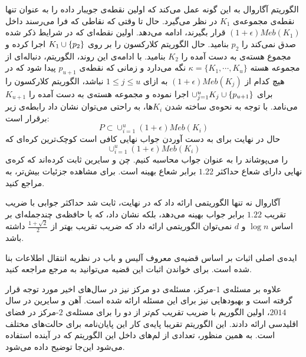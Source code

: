 الگوریتم آگاروال به این گونه عمل می‌کند که اولین نقطه‌ی جویبار داده را به عنوان تنها نقطه‌ی مجموعه‌ی $K_1$ در نظر می‌گیرد. حال تا وقتی که نقاطی که فرا می‌رسند داخل $(1 + \epsilon)Meb(K_1)$ قرار بگیرند، ادامه می‌دهد. اولین نقطه‌ای که در شرایط‌ ذکر شده صدق نمی‌کند را $p_2$ بنامید. حال الگوریتم کلارکسون را بر روی $K_1 \cup \left\{ p_2 \right\}$ اجرا کرده و مجموع هسته‌ی به دست آمده را $K_2$ بنامید. با ادامه‌ی این روند، الگوریتم، دنباله‌ای از مجموعه هسته $\kappa = \{ K_1, \cdots, K_u \}$ نگه می‌دارد و زمانی که نقطه‌ی $p_{u+1}$ پیدا شود که در هیچ کدام از $(1 + \epsilon)Meb(K_j)$ به ازای $1 \leq j \leq u$ نباشد، الگوریتم کلارکسون را برای $\cup_{j = 1}^{u} K_j \cup \left\{ p_{u+1} \right\}$ اجرا نموده و مجموعه هسته‌ی به دست آمده را $K_{u+1}$ می‌نامد. با توجه به نحوه‌ی ساخته شدن $K_i$ها، به راحتی می‌توان نشان داد رابطه‌ی زیر برقرار است:
$$P \subset \cup_{i=1}^u (1+\epsilon)Meb(K_i)$$
حال در نهایت برای به دست آوردن جواب نهایی کافی است کوچک‌ترین کره‌ای که 
$$\cup_{i=1}^u (1+\epsilon)Meb(K_i)$$
 را می‌پوشاند را به عنوان جواب محاسبه کنیم. چن و سایرین ثابت کرده‌اند که کره‌ی نهایی دارای شعاع حداکثر $1.22$ برابر شعاع بهینه است. برای مشاهده‌ جزئیات بیش‌تر، به  مراجع کنید.

آگاروال نه تنها الگوریتمی ارائه داد که در نهایت، ثابت شد حداکثر جوابی با ضریب تقریب $1.22$ برابر جواب بهینه می‌دهد، بلکه نشان داد، که با حافظه‌ی چندجمله‌ای بر اساس $\log{n}$ و $d$ نمی‌توان الگوریتمی ارائه داد که ضریب تقریب بهتر از $\frac{1 + \sqrt{2}}{2}$ داشته باشد.




ایده‌ی اصلی اثبات بر اساس قضیه‌ی معروف آلیس و باب در نظریه انتقال اطلاعات بنا شده است. برای خواندن اثبات این قضیه می‌توانید به مرجع  مراجعه کنید.


علاوه بر مسئله‌ی $1$-مرکز، مسئله‌ی دو مرکز نیز در سال‌های اخیر مورد توجه قرار گرفته است و بهبود‌هایی نیز برای این مسئله ارائه شده است. آهن و سایرین  در سال $2014$، اولین الگوریم با ضریب تقریب کم‌تر از دو را برای مسئله‌ی $2$-مرکز در فضای اقلیدسی ارائه دادند. این الگوریتم تقریبا پایه‌ی کار این پایان‌نامه برای حالت‌های مختلف است. به همین منظور، تعدادی از لم‌های داخل این الگوریتم که در آینده استفاده می‌شود این‌جا توضیح داده می‌شود.


